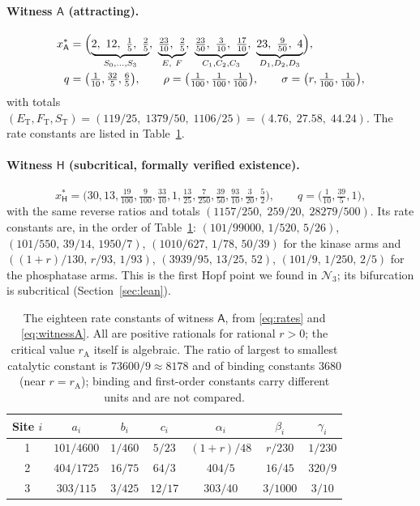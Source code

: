 \documentclass[11pt,a4paper]{article}
\theoremstyle{plain}
\theoremstyle{definition}
\theoremstyle{remark}
\newcommand{\cN}{\mathcal N}
\newcommand{\ET}{E_{\mathrm T}}
\newcommand{\FT}{F_{\mathrm T}}
\newcommand{\ST}{S_{\mathrm T}}
\newcommand{\rA}{r_{\mathrm A}}
\newcommand{\WA}{\mathsf A}
\newcommand{\WH}{\mathsf H}
\begin{document}
\paragraph{Witness $\WA$ (attracting).}
\begin{equation}\label{eq:witnessA}
\begin{aligned}
 x^*_{\WA}&=\Bigl(\underbrace{2,\ 12,\ \tfrac15,\ \tfrac25}_{S_0,\dots,S_3},\ \underbrace{\tfrac{23}{10},\ \tfrac25}_{E,\ F},\ \underbrace{\tfrac{23}{50},\ \tfrac3{10},\ \tfrac{17}{10}}_{C_1,C_2,C_3},\ \underbrace{23,\ \tfrac9{50},\ 4}_{D_1,D_2,D_3}\Bigr),\\
 q&=\bigl(\tfrac1{10},\tfrac{32}5,\tfrac65\bigr),\qquad \rho=\bigl(\tfrac1{100},\tfrac1{100},\tfrac1{100}\bigr),\qquad \sigma=\bigl(r,\tfrac1{100},\tfrac1{100}\bigr),
\end{aligned}
\end{equation}
with totals $(\ET,\FT,\ST)=(119/25,\;1379/50,\;1106/25)=(4.76,\;27.58,\;44.24)$. The rate constants are listed in Table~\ref{tab:ratesA}.

\paragraph{Witness $\WH$ (subcritical, formally verified existence).}
\begin{equation}\label{eq:witnessH}
 x^*_{\WH}=\bigl(30,13,\tfrac{19}{100},\tfrac9{100},\tfrac{33}{10},1,\tfrac{13}{25},\tfrac7{250},\tfrac{39}{50},\tfrac{93}{10},\tfrac3{20},\tfrac52\bigr),\qquad q=\bigl(\tfrac1{10},\tfrac{39}5,1\bigr),
\end{equation}
with the same reverse ratios and totals $(1157/250,\;259/20,\;28279/500)$. Its rate constants are, in the order of Table~\ref{tab:ratesA}: $(101/99000,\,1/520,\,5/26)$, $(101/550,\,39/14,\,1950/7)$, $(1010/627,\,1/78,\,50/39)$ for the kinase arms and $((1+r)/130,\,r/93,\,1/93)$, $(3939/95,\,13/25,\,52)$, $(101/9,\,1/250,\,2/5)$ for the phosphatase arms. This is the first Hopf point we found in $\cN_3$; its bifurcation is subcritical (Section~\ref{sec:lean}).

\begin{table}[htbp]
\centering
\begin{tabular}{c@{\qquad}ccc@{\qquad}ccc}
\toprule
Site $i$ & $a_i$ & $b_i$ & $c_i$ & $\alpha_i$ & $\beta_i$ & $\gamma_i$\\
\midrule
1 & $101/4600$ & $1/460$ & $5/23$ & $(1+r)/48$ & $r/230$ & $1/230$\\
2 & $404/1725$ & $16/75$ & $64/3$ & $404/5$ & $16/45$ & $320/9$\\
3 & $303/115$ & $3/425$ & $12/17$ & $303/40$ & $3/1000$ & $3/10$\\
\bottomrule
\end{tabular}
\caption{The eighteen rate constants of witness $\WA$, from \eqref{eq:rates} and \eqref{eq:witnessA}. All are positive rationals for rational $r>0$; the critical value $\rA$ itself is algebraic. The ratio of largest to smallest catalytic constant is $73600/9\approx8178$ and of binding constants $3680$ (near $r=\rA$); binding and first-order constants carry different units and are not compared.}
\label{tab:ratesA}
\end{table}
\end{document}
